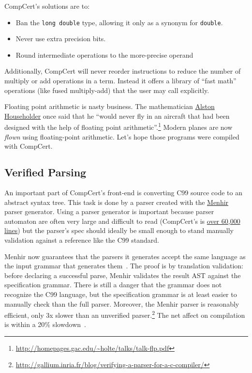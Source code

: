 CompCert's solutions are to:
\begin{itemize}
\item Ban the \lstinline{long double} type, allowing it only as a synonym for \lstinline{double}.
\item Never use extra precision bits.
\item Round intermediate operations to the more-precise operand
\end{itemize}
Additionally, CompCert will never reorder instructions to reduce the number of multiply or add operations in a term.
Instead it offers a library of ``fast math'' operations (like fused multiply-add) that the user may call explicitly.

Floating point arithmetic is nasty business.
The mathematician \href{https://en.wikipedia.org/wiki/Alston_Scott_Householder}{Alston Householder} once said that he
  ``would never fly in an aircraft that had been designed with the help of floating point arithmetic''.\footnote{\url{http://homepages.gac.edu/~holte/talks/talk-flp.pdf}}
Modern planes are now \emph{flown} using floating-point arithmetic.
Let's hope those programs were compiled with CompCert.


\subsection{Verified Parsing}
\label{sec:menhir}

An important part of CompCert's front-end is converting C99 source code to an abstract syntax tree.
This task is done by a parser created with the \href{http://gallium.inria.fr/~fpottier/menhir/}{Menhir} parser generator.
Using a parser generator is important because parser automaton are often very large and difficult to read (CompCert's is \href{https://github.com/AbsInt/CompCert/blob/master/cparser/Parser.vy}{over 60,000 lines})
 but the parser's spec should ideally be small enough to stand manually validation against a reference like the C99 standard.

Menhir now guarantees that the parsers it generates accept the same language as the input grammar that generates them~\cite{jpl-validating}.
The proof is by translation validation: before declaring a successful parse, Menhir validates the result AST against the specification grammar.
There is still a danger that the grammar does not recognize the C99 language, but the specification grammar is at least easier to manually check than the full parser.
Moreover, the Menhir parser is reasonably efficient, only 3x slower than an unverified parser.\footnote{\url{http://gallium.inria.fr/blog/verifying-a-parser-for-a-c-compiler/}}
The net affect on compilation is within a 20\% slowdown~\cite{jpl-validating}.


